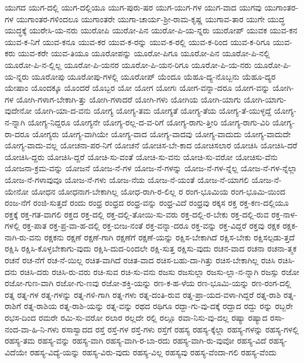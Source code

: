 {ಯುಗದ
ಯುಗ-ದಲ್ಲಿ
ಯುಗ-ದಲ್ಲಿಯೂ
ಯುಗ-ಪುರು-ಷರ
ಯುಗ-ಯುಗ-ಗಳ
ಯುಗ-ವಾದ
ಯುಗವು
ಯುಗಾಂತರ-ಗಳ
ಯುಗಾಂತರ-ಗಳಿಂದಲೂ
ಯುಗಾಂತರೇ
ಯುಗಾ-ಚಾರ್ಯ-ಶ್ರೀ-ರಾಮ-ಕೃಷ್ಣ
ಯುಗಾವ-ತಾರ
ಯುಗೇ
ಯುದ್ಧ
ಯುದ್ಧಕ್ಕೆ
ಯುರೇಸಿ-ಯ-ನರು
ಯುರೋಪಿ
ಯುರೋ-ಪಿನ
ಯುರೋ-ಪಿ-ಯ-ನ್ನರು
ಯುರೋಪ್
ಯುವಕ
ಯುವ-ಕನ
ಯುವ-ಕ-ನಿಗೆ
ಯುವ-ಕನೂ
ಯುವ-ಕರ
ಯುವ-ಕ-ರನ್ನು
ಯುವ-ಕ-ರಲ್ಲಿ
ಯುವ-ಕ-ರಿಂದ
ಯುವ-ಕ-ರಿಗೂ
ಯುವ-ಕರು
ಯುವ-ಕರೇ
ಯುವ-ತಿಯೂ
ಯೂರೋಪನ್ನು
ಯೂರೋ-ಪಿಗೂ
ಯೂರೋ-ಪಿನ
ಯೂರೋ-ಪಿ-ನಲ್ಲಿ
ಯೂರೋ-ಪಿ-ನ-ಲ್ಲಿಲ್ಲ
ಯೂರೋ-ಪಿ-ಯನರ
ಯೂರೋ-ಪಿ-ಯನ-ರಿಗೂ
ಯೂರೋ-ಪಿ-ಯ-ನರು
ಯೂರೋ-ಪಿ-ಯ-ನ್ನರು
ಯೂರೋಪು
ಯೂರೋಪು-ಗಳಲ್ಲಿ
ಯೂರೋಪ್
ಯೆಂದೂ
ಯೆಹೂ-ದ್ಯ-ನೊಬ್ಬನು
ಯೆಹೂ-ದ್ಯರ
ಯೇಷಾಂ
ಯೊಂದಕ್ಕೂ
ಯೊಂದರೆ
ಯೊಬ್ಬರ
ಯೋ
ಯೋಗ
ಯೋಗಃ
ಯೋಗ-ವನ್ನಾ-ದರೂ
ಯೋಗ-ವನ್ನು
ಯೋಗಿ-ಗಳ
ಯೋಗಿ-ಗಳಾಗ-ಬೇಕಾಗಿ-ತ್ತು
ಯೋಗಿ-ಗಳಾದರೆ
ಯೋಗಿ-ಗಳು
ಯೋಗಿಯ
ಯೋಗಿ-ಯಾಗು
ಯೋಗಿ-ಯಾಗು-ವುದೇನೋ
ಯೋಗಿ-ಯಾ-ದ-ವನು
ಯೋಗ್ಯ
ಯೋಗ್ಯ-ತಮ
ಯೋಗ್ಯತೆ
ಯೋಗ್ಯ-ತೆಯ
ಯೋಗ್ಯ-ತೆ-ಯುಳ್ಳದ್ದೆ
ಯೋಗ್ಯ-ನ-ನ್ನಾಗಿ
ಯೋಗ್ಯ-ನಿದ್ದರೂ
ಯೋಗ್ಯನೇ
ಯೋಗ್ಯ-ರಲ್ಲ-ದ-ವ-ರಿಗೆ
ಯೋಗ್ಯ-ರಾಗು-ತ್ತೀರಿ
ಯೋಗ್ಯ-ರಾಗು-ವಿರಿ
ಯೋಗ್ಯ-ರಾ-ದರೂ
ಯೋಗ್ಯರು
ಯೋಗ್ಯ-ವಾಗಿಯೇ
ಯೋಗ್ಯ-ವಾದ
ಯೋಗ್ಯ-ವಾದವು
ಯೋಗ್ಯ-ವಾದುದು
ಯೋಗ್ಯ-ವಾದುದೇ
ಯೋಗ್ಯ-ವಾದು-ವಲ್ಲ
ಯೋಚನಾ-ಪರ-ನಿಗೆ
ಯೋಚನೆ
ಯೋಚಿಸ-ಬೇ-ಕಾದ
ಯೋಚಿಸಲಾರ
ಯೋಚಿಸಿ
ಯೋಚಿಸಿ-ದರೆ
ಯೋಚಿಸಿ-ದ್ದರು
ಯೋಚಿಸಿ-ದ್ದರೆ
ಯೋಚಿ-ಸು-ವಂತೆ
ಯೋಚಿ-ಸು-ವನು
ಯೋಚಿ-ಸು-ವರೋ
ಯೋಚಿಸು-ವೆನು
ಯೋಜನಾ-ಕ್ರಮ-ವನ್ನು
ಯೋಜನೆ
ಯೋಜ-ನೆ-ಗಳ
ಯೋಜ-ನೆ-ಗಳನ್ನು
ಯೋಜ-ನೆ-ಗಳ-ನ್ನೆಲ್ಲ
ಯೋಜ-ನೆ-ಗಳ-ನ್ನೆಲ್ಲಾ
ಯೋಜ-ನೆ-ಗಳಾವುವೂ
ಯೋಜ-ನೆ-ಗಳು
ಯೋಜ-ನೆಯ
ಯೋಜ-ನೆ-ಯಂತೆ
ಯೋಜ-ನೆ-ಯಾಗಲಿ
ಯೋಜ-ನೆ-ಯೇನೋ
ಯೋಧನ
ಯೋಧನಾಗ-ಬೇಕಾಗಿಲ್ಲ
ಯೋಧ-ರಾಗಿ-ರ-ಲಿಲ್ಲ
ರ
ರಂಗ-ಭೂಮಿಯ
ರಂಗ-ಭೂಮಿ-ಯಿಂದ
ರಂಜ-ನೆಗೆ
ರಂಜಿ-ಸುತ್ತದೆ
ರಂದು
ರಂಧ್ರ
ರಂಧ್ರದ
ರಂಧ್ರ-ವನ್ನು
ರಂಧ್ರ-ವಿದೆ
ರಂಧ್ರವು
ರಕ್ಕಸ
ರಕ್ತ
ರಕ್ತ-ಕಣ-ದಲ್ಲಿಯೂ
ರಕ್ತಕ್ಕೆ
ರಕ್ತ-ಗತ-ವಾಗಲಿ
ರಕ್ತದ
ರಕ್ತ-ದಲ್ಲಿ
ರಕ್ತ-ದಲ್ಲಿ-ತೋಯಿ-ಸು-ವರು
ರಕ್ತ-ದಲ್ಲಿ-ರ-ಬೇಕು
ರಕ್ತ-ದಲ್ಲಿ-ರುವ
ರಕ್ತ-ನಾಳ-ಗಳಲ್ಲಿ
ರಕ್ತ-ಪಾತ
ರಕ್ತ-ಪ್ರ-ವಾ-ಹ-ದಲ್ಲಿ
ರಕ್ತ-ಬೀಜ-ನಂತೆ
ರಕ್ತ-ವನ್ನಾ-ದರೂ
ರಕ್ತ-ವನ್ನು
ರಕ್ತ-ವಿದ್ದರೆ
ರಕ್ತವು
ರಕ್ಷಕ
ರಕ್ಷಕ-ನಾಗಿ-ರು-ವನು
ರಕ್ಷಕನು
ರಕ್ಷಣೆ
ರಕ್ಷಣೆ-ಗಾಗಿ
ರಕ್ಷಣೆಗೆ
ರಕ್ಷಣೆ-ಯನ್ನು
ರಕ್ಷಿಸ-ಬೇಕಾಗಿದೆ
ರಕ್ಷಿಸ-ಬೇಕು
ರಕ್ಷಿಸಲ್ಪಡು-ತ್ತದೆ
ರಕ್ಷಿಸಿ
ರಕ್ಷಿಸಿ-ಕೊಳ್ಳಬೇಕಾಗು-ವುದು
ರಕ್ಷಿಸಿ-ದುದ-ರಿಂದಲೇ
ರಕ್ಷಿ-ಸುತ್ತ
ರಕ್ಷಿಸು-ವುದು
ರಚನ-ವಾದ
ರಚನಾ
ರಚನಾ-ತ್ಮಕ
ರಚನೆ
ರಚ-ನೆಗೆ
ರಚ-ನೆ-ಯಿಲ್ಲ
ರಚಿತ-ವಾಗಿದೆ
ರಚಿತ-ವಾದ
ರಚಿಸ-ಬಹು-ದಾ-ಗಿತ್ತು
ರಚಿಸ-ಬೇಕಾಗಿಲ್ಲ
ರಚಿಸಿ
ರಚಿಸಿ-ದನು
ರಚಿಸಿ-ದರು
ರಚಿಸಿ-ರು-ವರು
ರಚಿ-ಸುವ
ರಚಿ-ಸು-ವನು
ರಜಸು
ರಜಸುಲ್ಲಾ
ರಜಸು-ಲ್ಲಾ-ನ-ನ್ನಾಗಿ
ರಜಸ್ಸು
ರಜೋ
ರಜೋ-ಗುಣ-ವಾಗಿ
ರಜೋ-ಗು-ಣವು
ರಜೋ-ಶಕ್ತಿ-ಯನ್ನು
ರಣ-ಕ-ಹ-ಳೆಯ
ರಣ-ಭೂಮಿ-ಯನ್ನು
ರಣ-ರಂಗ-ದಲ್ಲಿ
ರತ್ನ
ರತ್ನ-ಗಳ
ರತ್ನ-ಗಳನ್ನು
ರತ್ನ-ಗಳಿ-ಗಾಗಿ
ರತ್ನ-ಗಳು
ರತ್ನ-ದಂತಿ-ರುವ
ರತ್ನ-ಪ್ರಾ-ಯದ-ವಳಾ-ಗಿದ್ದರೆ
ರತ್ನ-ರಾಶಿ
ರತ್ನ-ರಾಶಿಗೆ
ರತ್ನ-ರಾಶಿಯ
ರತ್ನ-ರಾಶಿ-ಯನ್ನು
ರತ್ನ-ವನ್ನು
ರಥದ
ರಥಿಗೂ
ರದ್ದಾ-ಗು-ವು-ದಕ್ಕೆ
ರದ್ದಾದ
ರದ್ದು
ರನ್ನು
ರಬ್ಬರೇ
ರಭಸ-ದಿಂದ
ರಮರೇ
ರಮಿ-ಸು-ವರೋ
ರಲಾರ
ರಲ್ಲದೇ
ರಲ್ಲಿ
ರಲ್ಲೂ
ರವಾ-ನಿಸು-ವು-ದಲ್ಲ
ರಷ್ಯಾ
ರಷ್ಯಾದ
ರಸಾ-ನಂದ-ವಾ-ಹಿ-ನಿ-ಗಳು
ರಸಾಸ್ವಾದದ
ರಸ್ತೆ
ರಸ್ತೆ-ಗಳ
ರಸ್ತೆ-ಗಳು
ರಸ್ತೆಗೆ
ರಹಸ್ಯ
ರಹಸ್ಯ-ಕ್ಕೆಲ್ಲಾ
ರಹಸ್ಯ-ಗಳನ್ನು
ರಹಸ್ಯ-ಗಳಲ್ಲಿ
ರಹಸ್ಯ-ತಮ
ರಹಸ್ಯ-ವನ್ನು
ರಹಸ್ಯ-ವಾಗಿ
ರಹಸ್ಯ-ವಾಗಿ-ರ-ಬಾ-ರದು
ರಹಸ್ಯ-ವಾಗಿ-ರು-ವುವೋ
ರಹಸ್ಯ-ವಿದೆ
ರಹಸ್ಯ-ವಿದೆಯೇ
ರಹಸ್ಯ-ವಿದ್ಯೆ-ಯನ್ನು
ರಹಸ್ಯ-ವಿರು-ವುದು
ರಹಸ್ಯ-ವಿಲ್ಲ
ರಹಸ್ಯವು
ರಹಸ್ಯ-ವೆಂದಾ-ಗಲಿ
ರಹಸ್ಯ-ವೆಂದು
}

